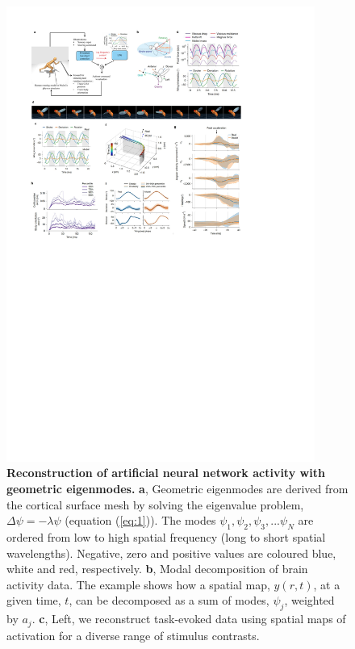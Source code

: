 \documentclass[sn-mathphys-num]{sn-jnl}%
\theoremstyle{thmstyleone}%
\theoremstyle{thmstyletwo}%
\theoremstyle{thmstylethree}%
\begin{document}
\begin{figure}[!htb]
	\centering
	\includegraphics[width=0.9\textwidth]{fig/fig_3.pdf}
	\caption{\textbf{Reconstruction of artificial neural network activity with geometric eigenmodes.}
	\textbf{a}, Geometric eigenmodes are derived from the cortical surface mesh by solving the eigenvalue problem,$ \Delta \psi = -\lambda \psi $ (equation (\ref{eq:1})). 
	The modes $ \psi_1, \psi_2, \psi_3, ... \psi_N $ are ordered from low to high spatial frequency (long to short spatial wavelengths). 
	Negative, zero and positive values are coloured blue, white and red, respectively.
	\textbf{b}, Modal decomposition of brain activity data. 
	The example shows how a spatial map, $ y(r,t) $, at a given time, $ t $, can be decomposed as a sum of modes, $ \psi_j $, weighted by $a_j$.
	\textbf{c}, Left, we reconstruct task-evoked data using spatial maps of activation for a diverse range of stimulus contrasts. 
}
\end{figure}
\end{document}
